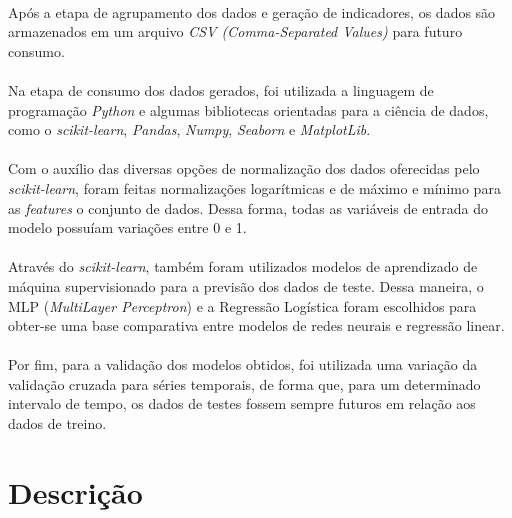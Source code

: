 \documentclass[grad,numbers]{coppe}
\begin{document}
    \paragraph{}Após a etapa de agrupamento dos dados e geração de indicadores, os dados são armazenados em um arquivo \textit{CSV (Comma-Separated Values)} para futuro consumo.
    
    \paragraph{}Na etapa de consumo dos dados gerados, foi utilizada a linguagem de programação \textit{Python} e algumas bibliotecas orientadas para a ciência de dados, como o \textit{scikit-learn}, \textit{Pandas}, \textit{Numpy}, \textit{Seaborn} e \textit{MatplotLib}.
    
    \paragraph{}Com o auxílio das diversas opções de normalização dos dados oferecidas pelo \textit{scikit-learn}, foram feitas normalizações logarítmicas e de máximo e mínimo para as \textit{features} o conjunto de dados. Dessa forma, todas as variáveis de entrada do modelo possuíam variações entre 0 e 1.
    
    \paragraph{}Através do \textit{scikit-learn}, também foram utilizados modelos de aprendizado de máquina supervisionado para a previsão dos dados de teste. Dessa maneira, o MLP (\textit{MultiLayer Perceptron}) e a Regressão Logística foram escolhidos para obter-se uma base comparativa entre modelos de redes neurais e regressão linear.
    
    \paragraph{}Por fim, para a validação dos modelos obtidos, foi utilizada uma variação da validação cruzada para séries temporais, de forma que, para um determinado intervalo de tempo, os dados de testes fossem sempre futuros em relação aos dados de treino.
  
  \section{Descrição}
  
\end{document}
